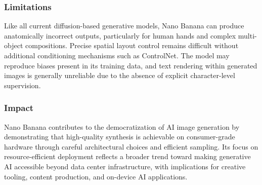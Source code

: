 \documentclass[11pt,a4paper]{report}
\begin{document}
\subsubsection{Limitations}
Like all current diffusion-based generative models, Nano Banana can produce anatomically incorrect outputs,
particularly for human hands and complex multi-object compositions. Precise spatial layout control remains
difficult without additional conditioning mechanisms such as ControlNet. The model may reproduce biases present
in its training data, and text rendering within generated images is generally unreliable due to the absence of
explicit character-level supervision.

\subsubsection{Impact}
Nano Banana contributes to the democratization of AI image generation by demonstrating that high-quality
synthesis is achievable on consumer-grade hardware through careful architectural choices and efficient sampling.
Its focus on resource-efficient deployment reflects a broader trend toward making generative AI accessible
beyond data center infrastructure, with implications for creative tooling, content production, and on-device
AI applications.
\end{document}
